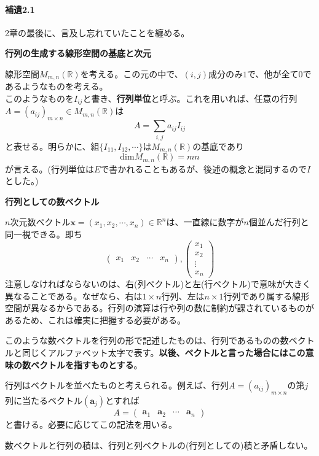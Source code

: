 \documentclass[dvipdfmx]{jsarticle}
\begin{document}
\paragraph{補遺2.1}\par
2章の最後に、言及し忘れていたことを纏める。\\\par
\textbf{行列の生成する線形空間の基底と次元}\par
線形空間$M_{m,n}(\mathbb{R})$を考える。この元の中で、$(i,j)$成分のみ$1$で、他が全て$0$であるようなものを考える。\\
このようなものを$I_{ij}$と書き、\textbf{行列単位}と呼ぶ。これを用いれば、任意の行列$A=(a_{ij})_{m \times n} \in M_{m,n}(\mathbb{R})$は
\[A=\sum_{i,j}a_{ij}I_{ij}\]
と表せる。明らかに、組$\{ I_{11},I_{12},\cdots \}$は$M_{m,n}(\mathbb{R})$の基底であり
\[\mathrm{dim}M_{m,n}(\mathbb{R})=mn\]
が言える。(行列単位は$E$で書かれることもあるが、後述の概念と混同するので$I$とした。)\\\par
\textbf{行列としての数ベクトル}\par
$n$次元数ベクトル$\bm{x}=(x_1,x_2,\cdots,x_n)\in\mathbb{R}^n$は、一直線に数字が$n$個並んだ行列と同一視できる。即ち
\[\begin{pmatrix}x_1&x_2&\cdots&x_n\end{pmatrix},\begin{pmatrix}x_1\\x_2\\\vdots\\x_n\end{pmatrix}\]
注意しなければならないのは、右(列ベクトル)と左(行ベクトル)で意味が大きく異なることである。なぜなら、右は$1 \times n$行列、左は$n \times 1$行列であり属する線形空間が異なるからである。行列の演算は行や列の数に制約が課されているものがあるため、これは確実に把握する必要がある。\par
このような数ベクトルを行列の形で記述したものは、行列であるものの数ベクトルと同じくアルファベット太字で表す。\textbf{以後、ベクトルと言った場合にはこの意味の数ベクトルを指すものとする}。\par
行列はベクトルを並べたものと考えられる。例えば、行列$A=(a_{ij})_{m \times n}$の第$j$列に当たるベクトル$(\bm{a}_j)$とすれば
\[A=\begin{pmatrix}\bm{a}_1&\bm{a}_2&\cdots&\bm{a}_n\end{pmatrix}\]
と書ける。必要に応じてこの記法を用いる。\par
数ベクトルと行列の積は、行列と列ベクトルの(行列としての)積と矛盾しない。\\\par
\end{document}
